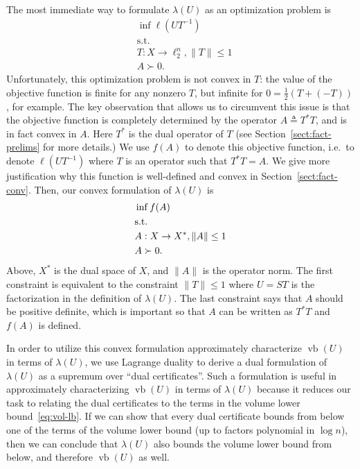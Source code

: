 \documentclass[11pt]{article}
\newcommand{\eqdef}{\triangleq}
\DeclareMathOperator{\vb}{vb}
\begin{document}
The most immediate way to formulate $\lambda(U)$ as an optimization
problem is 
\begin{align*}
  &\inf %
  \ell(UT^{-1})\\
  &\text{s.t.}\\
  &T:X \to\ell_2^n,\|T\| \le 1\\
  &A \succ 0.
\end{align*}
Unfortunately, this optimization problem is not convex in $T$: the
value of the objective function is finite for any nonzero $T$, but
infinite for $0 = \frac12(T + (-T))$, for example. The key observation
that allows us to circumvent this issue is that the objective function
is completely determined by the operator $A \eqdef T^*T$, and is in
fact convex in $A$. Here $T^*$ is the dual operator of $T$ (see
Section~\ref{sect:fact-prelims} for more details.) We use $f(A)$ to
denote this objective function, i.e.~to denote $\ell(UT^{-1})$ where
$T$ is an operator such that $T^*T = A$. We give more justification
why this function is well-defined and convex in
Section~\ref{sect:fact-conv}. Then, our convex formulation of
$\lambda(U)$ is
\begin{align*}
  &\inf  f(A) \\
  &\text{s.t.}\notag\\
  &A: X \to X^*,\|A\| \le 1\\
  &A \succ 0.
\end{align*}
Above, $X^*$ is the dual space of $X$, and $\|A\|$ is the operator
norm. The first constraint is equivalent to the constraint $\|T\|\le
1$ where $U = ST$ is the factorization in the definition of
$\lambda(U)$. The last constraint says that $A$ should be positive
definite, which is important so that $A$ can be written as $T^*T$ and
$f(A)$ is defined. 

In order to utilize this convex formulation approximately characterize
$\vb(U)$ in terms of $\lambda(U)$, we use Lagrange duality to derive a
dual formulation of $\lambda(U)$ as a supremum over ``dual
certificates''. Such a formulation is useful in approximately
characterizing $\vb(U)$ in terms of $\lambda(U)$ because it reduces
our task to relating the dual certificates to the terms in
the volume lower bound~\eqref{eq:vol-lb}. If we can show that every
dual certificate bounds from below one of the terms of the volume
lower bound (up to factors polynomial in $\log n$), then we can
conclude that $\lambda(U)$ also bounds the volume lower bound from
below, and therefore $\vb(U)$ as well. 
\end{document}
